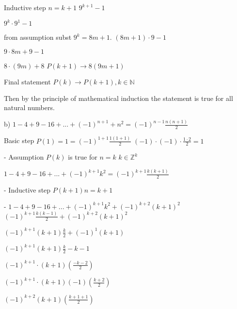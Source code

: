 Inductive step $n=k+1$ $9^{k+1}-1$

$9^k\cdot 9^1-1$

from assumption subst $9^k=8m+1$.
$(8m+1)\cdot 9-1$

$9\cdot 8m+9-1$

$8\cdot (9m)+8$
$P(k+1)\rightarrow 8(9m+1)$

Final statement $P(k)\rightarrow P(k+1), k\in\mathbb{N}$

Then by the principle of mathematical induction the statement is true for all natural numbers.

b) $1-4+9-16+...+(-1)^{n+1}+n^2=(-1)^{n-1}\frac{n(n+1)}{2}$

Basic step $P(1)=1=(-1)^{1+1}\frac{1(1+1)}{2}$
$(-1)\cdot(-1)\cdot\frac{1\cdot 2}{2}=1$

- Assumption $P(k)$ is true for $n=k$ $k\in\mathbb{Z}^k$

$1-4+9-16+...+(-1)^{k+1}k^2=(-1)^{k+1}\frac{k(k+1)}{2}$

- Inductive step $P(k+1) n=k+1$

- $1-4+9-16+...+(-1)^{k+1}k^2+(-1)^{k+2}(k+1)^2$
$(-1)^{k+1}\frac{k(k-1)}{2}+(-1)^{k+2}(k+1)^2$

$(-1)^{k+1}(k+1){\frac{k}{2}+(-1)^1(k+1)}$

$(-1)^{k+1}(k+1){\frac{k}{2}-k-1}$

$(-1)^{k+1}\cdot(k+1)(\frac{-k-2}{2})$

$(-1)^{k+1}\cdot(k+1)(-1)(\frac{k+2}{2})$

$(-1)^{k+2}(k+1)(\frac{k+1+1}{2})$
